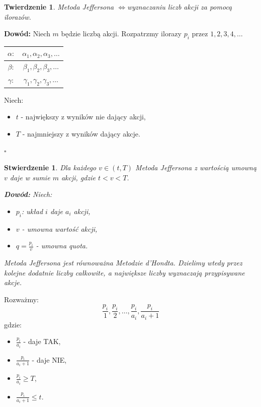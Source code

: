 \documentclass[12pt,a4paper]{article}
\newcounter{twierdzenie}
\theoremstyle{break}
\newtheorem{theorem}{Twierdzenie}[section]
\newtheorem{stwierdzenie}{Stwierdzenie}[section]
\newcommand{\witw}{$\Leftrightarrow$}
\begin{document}
	\begin{theorem}
		Metoda Jeffersona \witw wyznaczaniu liczb akcji za pomocą ilorazów.
	\end{theorem}
	
	\noindent \textbf{Dowód:} Niech $m$ będzie liczbą akcji. Rozpatrzmy ilorazy $p_i$ przez $1, 2, 3, 4, \dots$
	
	\begin{tabular}{c|c}
		$\alpha:$ & $\alpha_1, \alpha_2, \alpha_3, \dots$ \\ \hline
		$\beta:$ & $\beta_1, \beta_2, \beta_3, \dots$ \\ \hline
		$\gamma:$ & $\gamma_1, \gamma_2, \gamma_3, \dots$ \\ \hline
	\end{tabular}
	
	Niech:
	\begin{itemize}
		\item $t$ - największy z wyników nie dający akcji,
		\item $T$ - najmniejszy z wyników dający akcje.
	\end{itemize}
	
	\begin{flushright}
		$\square$
	\end{flushright}
	
	\begin{stwierdzenie}
		Dla każdego $v \in (t, T)$ Metoda Jeffersona z wartością umowną $v$ daje w sumie $m$ akcji, gdzie $t < v < T$.
		
		\noindent \textbf{Dowód:} Niech:
		\begin{itemize}
			\item $p_i$: układ $i$ daje $a_i$ akcji,
			\item $v$ - umowna wartość akcji,
			\item $\overset{~}{q} = \frac{p_i}{v}$ - umowna quota.
		\end{itemize}
		
		Metoda Jeffersona jest równoważna Metodzie d'Hondta. Dzielimy wtedy przez kolejne dodatnie liczby całkowite, a największe liczby wyznaczają przypisywane akcje.
	\end{stwierdzenie}
	
	Rozważmy:
	\[
	\frac{p_i}{1}, \frac{p_i}{2}, \dots, \frac{p_i}{a_i}, \frac{p_i}{a_i + 1}
	\]
	gdzie:
	\begin{itemize}
		\item $\frac{p_i}{a_i}$ - daje TAK,
		\item $\frac{p_i}{a_i + 1}$ - daje NIE,
		\item $\frac{p_i}{a_i} \geq T$,
		\item $\frac{p_i}{a_i + 1} \leq t$.
	\end{itemize}
	
\end{document}
